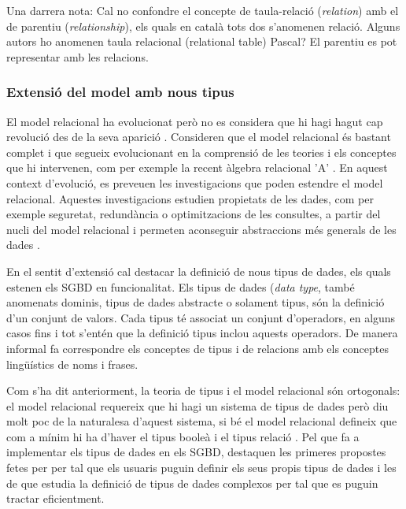 \todo{}

Una darrera nota:
 Cal no confondre el
concepte de taula-relació (\emph{relation}) amb el de parentiu
(\emph{relationship}), els quals en català tots dos s'anomenen relació. 
Alguns autors ho anomenen taula relacional (relational table) Pascal? \parencite{dbdebunk}
El parentiu es pot representar amb les relacions.






\subsubsection{Extensió del model amb nous tipus}

El model relacional ha evolucionat però no es considera que hi hagi hagut
cap revolució des de la seva aparició
\parencite[cap.~19]{date06}. %
Consideren que el model relacional és bastant complet i que segueix
evolucionant en la comprensió de les teories i els conceptes que hi
intervenen, com per exemple la recent àlgebra relacional
'A' \parencite[ap.~A]{date06:_datab_types_relat_model}.  En aquest
context d'evolució, es preveuen les investigacions que poden estendre
el model relacional. Aquestes investigacions estudien propietats de
les dades, com per exemple seguretat, redundància o optimitzacions de
les consultes, a partir del nucli del model relacional i permeten
aconseguir abstraccions més generals de les
dades \parencite[cap.~25]{date06}. %


En el sentit d'extensió cal destacar la definició de nous tipus de
dades, els quals estenen els SGBD en funcionalitat.  Els tipus de
dades (\emph{data type}, també anomenats dominis, tipus de dades
abstracte o solament tipus, són la definició d'un conjunt de
valors. Cada tipus té associat un conjunt d'operadors, en alguns casos
fins i tot s'entén que la definició tipus inclou aquests operadors.
De manera informal \parencite{date04:introduction8} fa correspondre
els conceptes de tipus i de relacions amb els conceptes lingüístics de
noms i frases.


Com s'ha dit anteriorment, la teoria de tipus i el model relacional
són ortogonals: el model relacional requereix que hi hagi un sistema
de tipus de dades però diu molt poc de la naturalesa d'aquest sistema,
si bé el model relacional defineix que com a mínim hi ha d'haver el
tipus booleà i el tipus
relació \parencite{date:thethirdmanifesto}. 
Pel que fa a implementar
els tipus de dades en els SGBD, destaquen les primeres propostes fetes per
\textcite{stonebraker86} per tal que els usuaris puguin definir els
seus propis tipus de dades i les de \textcite{seshadri98:_enhan} que
estudia la definició de tipus de dades complexos per tal que es puguin
tractar eficientment.


